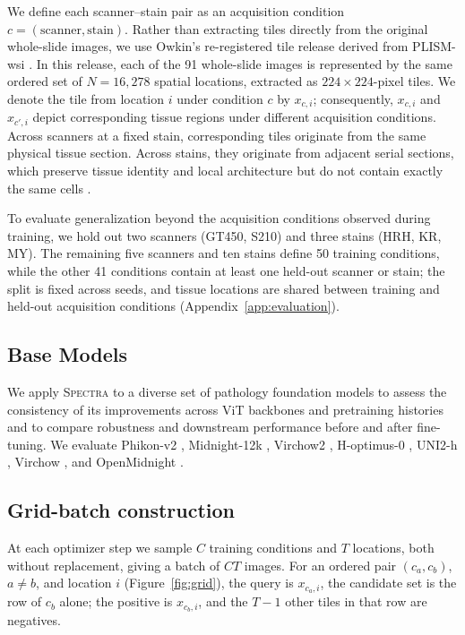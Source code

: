 \documentclass{article}
\begin{document}
We define each scanner--stain pair as an acquisition condition
$c=(\text{scanner},\text{stain})$. Rather than extracting tiles directly from the original whole-slide images, we use Owkin's re-registered tile release derived from PLISM-wsi \citep{filiot2025distill}. In this release, each of the 91 whole-slide images is represented by the same ordered set of $N=16{,}278$ spatial locations, extracted as $224\times224$-pixel tiles. We denote the tile from location $i$ under condition $c$ by $x_{c,i}$; consequently, $x_{c,i}$ and $x_{c',i}$ depict corresponding tissue regions under different acquisition conditions. Across scanners at a fixed stain, corresponding tiles originate from the same physical tissue section. Across stains, they originate from adjacent serial sections, which preserve tissue identity and local architecture but do not contain exactly the same cells \citep{ochi2024plism}.

To evaluate generalization beyond the acquisition conditions observed during training, we hold out two scanners (GT450, S210) and three stains (HRH, KR, MY). The remaining five scanners and ten stains define 50 training conditions, while the other 41 conditions contain at least one held-out scanner or stain; the split is fixed across seeds, and tissue locations are shared between training and held-out acquisition conditions (Appendix~\ref{app:evaluation}).

\subsection{Base Models}
We apply \textsc{Spectra} to a diverse set of pathology foundation models to assess the consistency of its improvements across ViT backbones and pretraining histories and to compare robustness and downstream performance before and after fine-tuning. We evaluate Phikon-v2 \citep{phikonv2}, Midnight-12k \citep{midnight}, Virchow2 \citep{virchow2}, H-optimus-0 \citep{hoptimus0}, UNI2-h \citep{uni2h,chen2024uni}, Virchow \citep{virchow}, and OpenMidnight \citep{openmidnight}.

\subsection{Grid-batch construction}
\label{sec:grid}

At each optimizer step we sample $C$ training conditions and $T$ locations, both without replacement, giving a batch of $CT$ images. For an ordered pair $(c_a,c_b)$, $a\neq b$, and location $i$
(Figure~\ref{fig:grid}), the query is $x_{c_a,i}$, the candidate set is the row of $c_b$ alone; the
positive is $x_{c_b,i}$, and the $T-1$ other tiles in that row are negatives. 
\end{document}
